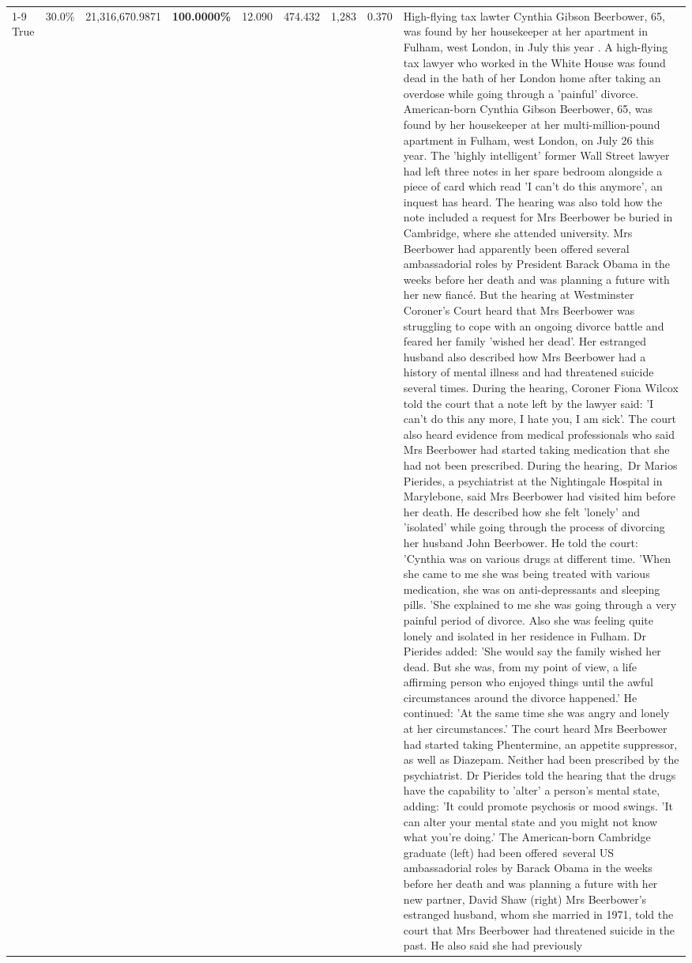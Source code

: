 \begin{table}[H]
\begin{tabular}{lllrlllll}
\cline{1-9}
True & 30.0\% & 21,316,670.9871 & \bfseries \color{red} 100.0000\% & 12.090 & 474.432 & 1,283 & 0.370 & High-flying tax lawter Cynthia Gibson Beerbower, 65, was found by her housekeeper at her apartment in Fulham, west London, in July this year . A high-flying tax lawyer who worked in the White House was found dead in the bath of her London home after taking an overdose while going through a 'painful' divorce. American-born Cynthia Gibson Beerbower, 65, was found by her housekeeper at her multi-million-pound apartment in Fulham, west London, on July 26 this year. The 'highly intelligent' former Wall Street lawyer had left three notes in her spare bedroom alongside a piece of card which read 'I can't do this anymore', an inquest has heard. The hearing was also told how the note included a request for Mrs Beerbower be buried in Cambridge, where she attended university. Mrs Beerbower had apparently been offered several ambassadorial roles by President Barack Obama in the weeks before her death and was planning a future with her new fiancé. But the hearing at Westminster Coroner's Court heard that Mrs Beerbower was struggling to cope with an ongoing divorce battle and feared her family 'wished her dead'. Her estranged husband also described how Mrs Beerbower had a history of mental illness and had threatened suicide several times. During the hearing, Coroner Fiona Wilcox told the court that a note left by the lawyer said: 'I can't do this any more, I hate you, I am sick'. The court also heard evidence from medical professionals who said Mrs Beerbower had started taking medication that she had not been prescribed. During the hearing, Dr Marios Pierides, a psychiatrist at the Nightingale Hospital in Marylebone, said Mrs Beerbower had visited him before her death. He described how she felt 'lonely' and 'isolated' while going through the process of divorcing her husband John Beerbower. He told the court: 'Cynthia was on various drugs at different time. 'When she came to me she was being treated with various medication, she was on anti-depressants and sleeping pills. 'She explained to me she was going through a very painful period of divorce. Also she was feeling quite lonely and isolated in her residence in Fulham. Dr Pierides added: 'She would say the family wished her dead. But she was, from my point of view, a life affirming person who enjoyed things until the awful circumstances around the divorce happened.' He continued: 'At the same time she was angry and lonely at her circumstances.' The court heard Mrs Beerbower had started taking Phentermine, an appetite suppressor, as well as Diazepam. Neither had been prescribed by the psychiatrist. Dr Pierides told the hearing that the drugs have the capability to 'alter' a person's mental state, adding: 'It could promote psychosis or mood swings. 'It can alter your mental state and you might not know what you're doing.' The American-born Cambridge graduate (left) had been offered several US ambassadorial roles by Barack Obama in the weeks before her death and was planning a future with her new partner, David Shaw (right) Mrs Beerbower's estranged husband, whom she married in 1971, told the court that Mrs Beerbower had threatened suicide in the past. He also said she had previously 
\end{tabular}
\end{table}
